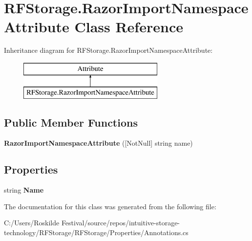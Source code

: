 \section{R\+F\+Storage.\+Razor\+Import\+Namespace\+Attribute Class Reference}
\label{class_r_f_storage_1_1_razor_import_namespace_attribute}
Inheritance diagram for R\+F\+Storage.\+Razor\+Import\+Namespace\+Attribute\+:\begin{figure}[H]
\begin{center}
\leavevmode
\includegraphics[height=2.000000cm]{class_r_f_storage_1_1_razor_import_namespace_attribute}
\end{center}
\end{figure}
\subsection*{Public Member Functions}
\begin{DoxyCompactItemize}
\item 
\mbox{\label{class_r_f_storage_1_1_razor_import_namespace_attribute_a9d06ac08038787302d0ebc3e814f066b}} 
{\bfseries Razor\+Import\+Namespace\+Attribute} ([Not\+Null] string name)
\end{DoxyCompactItemize}
\subsection*{Properties}
\begin{DoxyCompactItemize}
\item 
\mbox{\label{class_r_f_storage_1_1_razor_import_namespace_attribute_a1052bc537b7ebf9a132134d1879ae5d4}} 
string {\bfseries Name}\hspace{0.3cm}{\ttfamily  [get]}
\end{DoxyCompactItemize}


The documentation for this class was generated from the following file\+:\begin{DoxyCompactItemize}
\item 
C\+:/\+Users/\+Roskilde Festival/source/repos/intuitive-\/storage-\/technology/\+R\+F\+Storage/\+R\+F\+Storage/\+Properties/Annotations.\+cs\end{DoxyCompactItemize}
